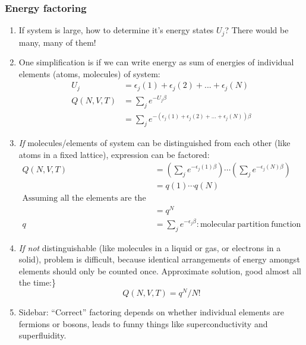\documentclass[11pt]{article}
\begin{document}
\subsubsection{Energy factoring}
\label{sec:org31870e0}
\begin{enumerate}
\item If system is large, how to determine it's energy states \(U_j\)?  There
would be many, many of them!
\item One simplification is if we can write energy as sum of energies of
individual elements (atoms, molecules) of system:
\begin{align}
  U_j&=\epsilon_j(1)+\epsilon_j(2) + ... + \epsilon_j(N) \\
  Q(N,V,T) &= \sum_j e^{-U_j\beta} \\
  &=\sum_je^{-(\epsilon_j(1)+\epsilon_j(2) + ... + \epsilon_j(N))\beta}
\end{align}
\item \emph{If} molecules/elements of system can be distinguished from each
other (like atoms in a fixed lattice), expression can be factored:
   \begin{align}
     Q(N,V,T)&=\left ( \sum_j e^{-\epsilon_j(1)\beta}\right )\cdots \left ( \sum_j
       e^{-\epsilon_j(N)\beta}\right ) \\
   &= q(1)\cdots q(N) \\
   \text{Assuming all the elements are the same:}\\
   &= q^N \\
  q&=\sum_j e^{-\epsilon_j \beta}: \mathrm{molecular\ partition\ function}
\end{align}
\item \emph{If not} distinguishable (like molecules in a liquid or gas, or
electrons in a solid), problem is difficult, because identical
arrangements of energy amongst elements should only be counted once.
Approximate solution, good almost all the time:\}
\begin{equation}
  Q(N,V,T)=q^N/N!
\end{equation}
\item Sidebar: ``Correct'' factoring depends on whether individual elements are fermions or bosons, leads to funny things like superconductivity and superfluidity.
\end{enumerate}
\end{document}
